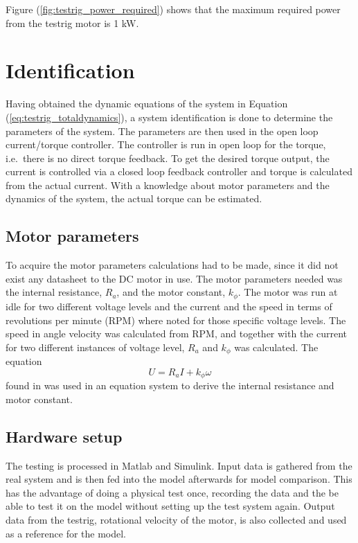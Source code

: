 Figure (\ref{fig:testrig_power_required}) shows that the maximum required power from the testrig motor is 1 kW.

\section{Identification}
Having obtained the dynamic equations of the system in Equation
(\ref{eq:testrig_totaldynamics}), a system identification is done to determine
the parameters of the system. The parameters are then used in the open loop
current/torque controller. The controller is run in open loop for the
torque, i.e.\ there is no direct torque feedback. To get the desired torque
output, the current is controlled via a closed loop feedback controller and
torque is calculated from the actual current. With a knowledge about motor
parameters and the dynamics of the system, the actual torque can be estimated. 

\subsection{Motor parameters}
To acquire the motor parameters  calculations had to be made, since it did not exist any datasheet to the DC motor in use. The motor parameters needed was the internal resistance, $R_{a}$, and the motor constant, $k_{\phi}$. The motor was run at idle for two different voltage levels and the current and the speed in terms of revolutions per minute (RPM) where noted for those specific voltage levels. The speed in angle velocity was calculated from RPM, and together with the current for two different instances of voltage level, $R_{a}$ and $k_{\phi}$ was calculated. The equation
\begin{equation}
\label{eq:motor_parameters}
    U = R_a I + k_{\phi} \omega
\end{equation}
found in \cite{elektroteknik2013} was used in an equation system to derive the internal resistance and motor constant.

\subsection{Hardware setup}
The testing is processed in Matlab and Simulink. Input data is gathered from the
real system and is then fed into the model afterwards for model comparison. This
has the advantage of doing a physical test once, recording the data and the be
able to test it on the model without setting up the test system again. Output
data from the testrig, rotational velocity of the motor, is also collected and
used as a reference for the model.

